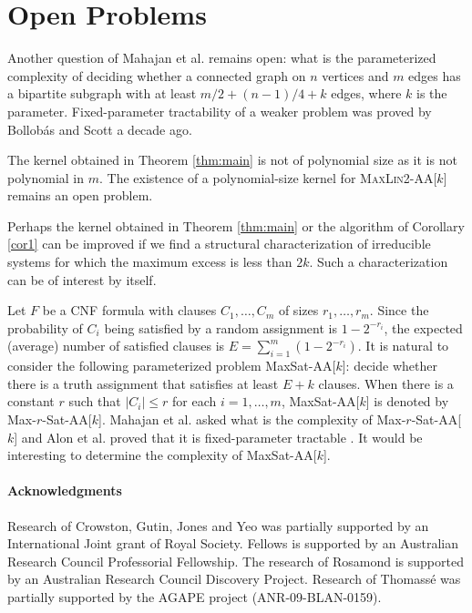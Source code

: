 \documentclass{llncs}
\begin{document}
\section{Open Problems}\label{sec:op}

Another question of Mahajan et al. \cite{MahajanRamanSikdar09} remains open: what
is the parameterized complexity of deciding whether a connected graph on $n$ vertices and $m$
edges has a bipartite subgraph with at least $m/2+(n-1)/4 + k$ edges, where $k$ is the parameter. Fixed-parameter tractability of a weaker problem was proved by Bollob{\'a}s and Scott \cite{BolSco2002} a decade ago.

The kernel obtained in Theorem \ref{thm:main} is not of polynomial size as it is not polynomial in $m$.
The existence of a polynomial-size kernel for
\textsc{MaxLin2-AA}[$k$] remains an open problem.

Perhaps the kernel obtained in Theorem \ref{thm:main} or the algorithm of Corollary \ref{cor1} can be improved
if we find a structural characterization of irreducible systems for which the maximum excess is less than $2k.$
Such a characterization can be of interest by itself.

Let $F$ be a CNF formula with clauses $C_1,\ldots ,C_m$ of sizes $r_1,\ldots ,r_m$.
Since the probability of $C_i$ being satisfied by a random assignment is $1-2^{-r_i}$, the expected (average)
number of satisfied clauses is $E=\sum_{i=1}^m(1-2^{-r_i}).$ It is natural to consider
the following parameterized problem {\sc MaxSat-AA}[$k$]: decide whether there is a truth assignment that satisfies at least
$E+k$ clauses. When there is a constant $r$ such that $|C_i|\le r$ for each $i=1,\ldots ,m$, {\sc MaxSat-AA}[$k$]
is denoted by {\sc Max-$r$-Sat-AA}[$k$]. Mahajan et al. \cite{MahajanRamanSikdar09} asked what is the complexity of {\sc Max-$r$-Sat-AA}[$k$]
and Alon et al. \cite{AloGutKimSzeYeo11} proved that it is fixed-parameter tractable \cite{AloGutKimSzeYeo11}. It would be interesting to determine the complexity of {\sc MaxSat-AA}[$k$].


\medskip

\paragraph{Acknowledgments}
Research of Crowston, Gutin, Jones and Yeo was partially supported by an International Joint grant of Royal Society.
Fellows is supported by an Australian Research Council Professorial Fellowship.  The research
of Rosamond is supported by an Australian Research Council Discovery Project.
Research of Thomass{\'e} was partially supported by  the AGAPE project (ANR-09-BLAN-0159).
\end{document}
